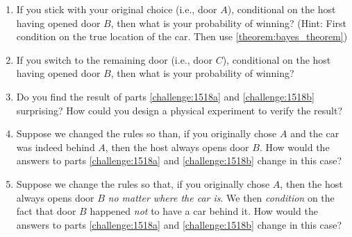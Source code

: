 \begin{challeges}
    \begin{enumerate}
       \item \label{challenge:1518a}If you stick with your original choice (i.e., door $A$), conditional on the host having opened door $B$, then what is your probability of winning? (Hint: First condition on the true location of the car. Then use \autoref{theorem:bayes_theorem})
       \item \label{challenge:1518b}If you switch to the remaining door (i.e., door $C$), conditional on the host having opened door $B$, then what is your probability of winning?
       \item Do you find the result of parts \autoref{challenge:1518a} and \autoref{challenge:1518b} surprising? How could you design a physical experiment to verify the result?
       \item Suppose we changed the rules so than, if you originally chose $A$ and the car was indeed behind $A$, then the host always opens door $B$. How would the answers to parts \autoref{challenge:1518a} and \autoref{challenge:1518b} change in this case?
       \item \label{challenge:1518e}Suppose we change the rules so that, if you originally chose $A$, then the host always opens door $B$ \emph{no matter where the car is}. We then \emph{condition} on the fact that door $B$ happened \emph{not} to have a car behind it. How would the answers to parts \autoref{challenge:1518a} and \autoref{challenge:1518b} change in this case?
   \end{enumerate}
\end{challeges}

